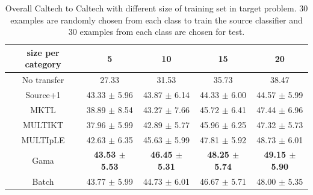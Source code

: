 \begin{table}[htbp]
  \centering
  \caption{Overall Caltech to Caltech with different size of training set in target problem. 30 examples are randomly chosen from each class to train the source classifier and 30 examples from each class are chosen for test. }
    \begin{tabular}{ccccc}
    \toprule
      size per category    & 5     & 10    & 15    & 20 \\
    \midrule
    No transfer &         27.33  &         31.53  &         35.73  &         38.47  \\
    Source+1    &         43.33 $\pm$ 5.96 &         43.87 $\pm$ 6.14  &         44.33 $\pm$ 6.00 &         44.57 $\pm$ 5.99  \\
    MKTL        &         38.89 $\pm$ 8.54 &         43.27 $\pm$ 7.66  &         45.72 $\pm$ 6.41 &         47.44 $\pm$ 6.96  \\
    MULTIKT     &         37.96 $\pm$ 5.99 &         42.89 $\pm$ 5.77  &         45.96 $\pm$ 6.25 &         47.32 $\pm$ 5.73 \\
    MULTIpLE    &         42.63 $\pm$ 6.35 &         45.63 $\pm$ 5.99  &         47.81 $\pm$ 5.92 &         48.73 $\pm$ 6.01\\
    Gama        &         \textbf{43.53 $\pm$ 5.53}&         \textbf{46.45 $\pm$ 5.31} &         \textbf{48.25 $\pm$ 5.74} &         \textbf{49.15 $\pm$ 5.90} \\
        \midrule
    Batch       &         43.77  $\pm$ 5.99&         44.73  $\pm$ 6.01 &         46.67 $\pm$ 5.71 &         48.00 $\pm$ 5.35\\
    \bottomrule
    \end{tabular}%
  \label{tab:C2C}%
\end{table}%


